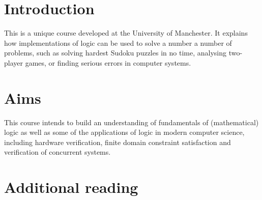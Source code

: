 \section*{Introduction}

This is a unique course developed at the University of Manchester. It explains
how implementations of logic can be used to solve a number a number of problems,
such as solving hardest Sudoku puzzles in no time, analysing two-player games,
or finding serious errors in computer systems.

\section*{Aims}

This course intends to build an understanding of fundamentals of (mathematical)
logic as well as some of the applications of logic in modern computer science,
including hardware verification, finite domain constraint satisfaction and
verification of concurrent systems.

\section*{Additional reading}

